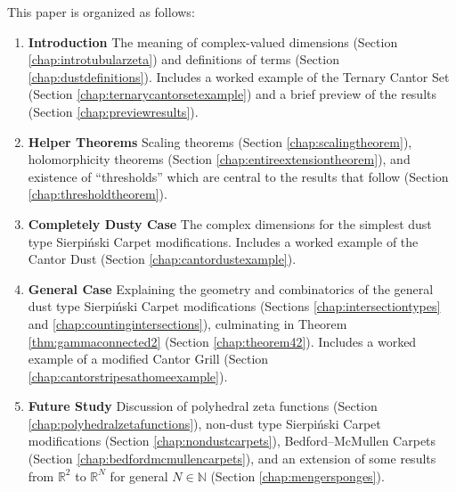 \documentclass{article}
\theoremstyle{plain}
\numberwithin{equation}{section}
\numberwithin{table}{section}
\numberwithin{figure}{section}
\begin{document}
This paper is organized as follows:
\begin{enumerate}
    \item \textbf{Introduction} The meaning of complex-valued dimensions (Section \ref{chap:introtubularzeta}) and definitions of terms (Section \ref{chap:dustdefinitions}). Includes a worked example of the Ternary Cantor Set (Section \ref{chap:ternarycantorsetexample}) and a brief preview of the results (Section \ref{chap:previewresults}).
    \item \textbf{Helper Theorems} Scaling theorems (Section \ref{chap:scalingtheorem}), holomorphicity theorems (Section \ref{chap:entireextensiontheorem}), and existence of ``thresholds'' which are central to the results that follow (Section \ref{chap:thresholdtheorem}).
    \item \textbf{Completely Dusty Case} The complex dimensions for the simplest dust type Sierpi\'nski Carpet modifications. Includes a worked example of the Cantor Dust (Section \ref{chap:cantordustexample}).
    \item \textbf{General Case} Explaining the geometry and combinatorics of the general dust type Sierpi\'nski Carpet modifications (Sections \ref{chap:intersectiontypes} and \ref{chap:countingintersections}), culminating in Theorem \ref{thm:gammaconnected2} (Section \ref{chap:theorem42}). Includes a worked example of a modified Cantor Grill (Section \ref{chap:cantorstripesathomeexample}).
    \item \textbf{Future Study} Discussion of polyhedral zeta functions (Section \ref{chap:polyhedralzetafunctions}), non-dust type Sierpi\'nski Carpet modifications (Section \ref{chap:nondustcarpets}), Bedford--McMullen Carpets (Section \ref{chap:bedfordmcmullencarpets}), and an extension of some results from $\mathbb{R}^2$ to $\mathbb{R}^N$ for general $N \in \mathbb{N}$ (Section \ref{chap:mengersponges}).
\end{enumerate}




\end{document}
